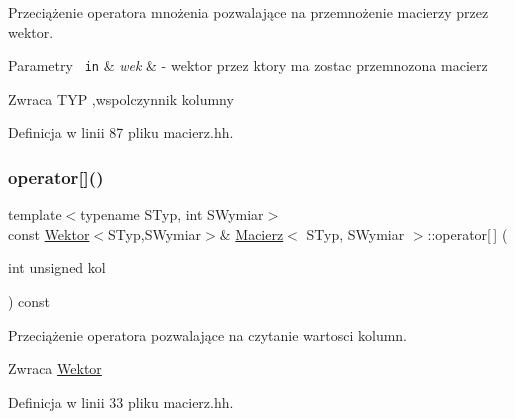 Przeciążenie operatora mnożenia pozwalające na przemnożenie macierzy przez wektor.


\begin{DoxyParams}[1]{Parametry}
\mbox{\texttt{ in}}  & {\em wek} & -\/ wektor przez ktory ma zostac przemnozona macierz \\
\hline
\end{DoxyParams}
\begin{DoxyReturn}{Zwraca}
T\+YP ,wspolczynnik kolumny 
\end{DoxyReturn}


Definicja w linii 87 pliku macierz.\+hh.

\mbox{\label{class_macierz_adeb8d422bb1765f12fb75aaada3591b7}} 
\subsubsection{\texorpdfstring{operator[]()}{operator[]()}\hspace{0.1cm}{\footnotesize\ttfamily [1/2]}}
{\footnotesize\ttfamily template$<$typename S\+Typ, int S\+Wymiar$>$ \\
const \mbox{\hyperlink{class_wektor}{Wektor}}$<$S\+Typ,S\+Wymiar$>$\& \mbox{\hyperlink{class_macierz}{Macierz}}$<$ S\+Typ, S\+Wymiar $>$\+::operator\mbox{[}$\,$\mbox{]} (\begin{DoxyParamCaption}\item[{int unsigned}]{kol }\end{DoxyParamCaption}) const\hspace{0.3cm}{\ttfamily [inline]}}

Przeciążenie operatora pozwalające na czytanie wartosci kolumn.

\begin{DoxyReturn}{Zwraca}
\mbox{\hyperlink{class_wektor}{Wektor}} 
\end{DoxyReturn}


Definicja w linii 33 pliku macierz.\+hh.

\mbox{\label{class_macierz_a345fd825f8e3e48b4a52cd051064c511}} 
